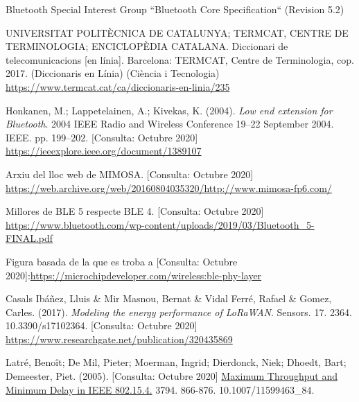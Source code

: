 \begin{thebibliography}{2}

Bluetooth Special Interest Group
``Bluetooth Core Specification``
(Revision 5.2)

UNIVERSITAT POLITÈCNICA DE CATALUNYA; TERMCAT, CENTRE DE TERMINOLOGIA; ENCICLOPÈDIA CATALANA. Diccionari de telecomunicacions [en línia]. Barcelona: TERMCAT, Centre de Terminologia, cop. 2017. (Diccionaris en Línia) (Ciència i Tecnologia)
\href{https://www.termcat.cat/ca/diccionaris-en-linia/235}{https://www.termcat.cat/ca/diccionaris-en-linia/235}

Honkanen, M.; Lappetelainen, A.; Kivekas, K. (2004). \textit{Low end extension for Bluetooth}. 2004 IEEE Radio and Wireless Conference 19–22 September 2004. IEEE. pp. 199–202.
[Consulta: Octubre 2020] \href{https://ieeexplore.ieee.org/document/1389107}{https://ieeexplore.ieee.org/document/1389107}

Arxiu del lloc web de MIMOSA. [Consulta: Octubre 2020]\newline
\href{https://web.archive.org/web/20160804035320/http://www.mimosa-fp6.com/}{https://web.archive.org/web/20160804035320/http://www.mimosa-fp6.com/}

Millores de BLE 5 respecte BLE 4. [Consulta: Octubre 2020]\newline
\href{https://www.bluetooth.com/wp-content/uploads/2019/03/Bluetooth\_5-FINAL.pdf}{https://www.bluetooth.com/wp-content/uploads/2019/03/Bluetooth\_5-FINAL.pdf}

Figura basada de la que es troba a [Consulta: Octubre 2020]:\newline \href{https://microchipdeveloper.com/wireless:ble-phy-layer}{https://microchipdeveloper.com/wireless:ble-phy-layer} 

Casals Ibáñez, Lluis \& Mir Masnou, Bernat \& Vidal Ferré, Rafael \& Gomez, Carles. (2017). \textit{Modeling the energy performance of LoRaWAN}. Sensors. 17. 2364. 10.3390/s17102364. 
[Consulta: Octubre 2020] \newline
\href{https://www.researchgate.net/publication/320435869}{https://www.researchgate.net/publication/320435869}

Latré, Benoît; De Mil, Pieter; Moerman, Ingrid; Dierdonck, Niek; Dhoedt, Bart; Demeester, Piet. (2005).
[Consulta: Octubre 2020] \href{https://www.researchgate.net/publication/220963645_Maximum_Throughput_and_Minimum_Delay_in_IEEE_802154}{Maximum Throughput and Minimum Delay in IEEE 802.15.4.} 3794. 866-876. 10.1007/11599463\_84.


\end{thebibliography}
